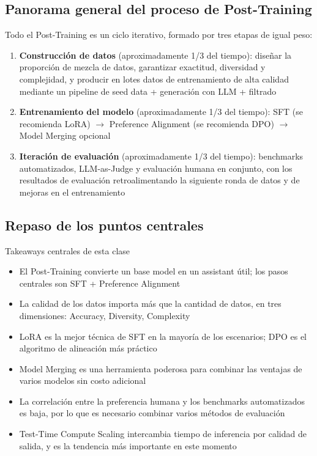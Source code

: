 \documentclass[a4paper]{article}
\begin{document}
\subsection{Panorama general del proceso de Post-Training}

Todo el Post-Training es un ciclo iterativo, formado por tres etapas de igual peso:

\begin{enumerate}
    \item \textbf{Construcción de datos} (aproximadamente 1/3 del tiempo): diseñar la proporción de mezcla de datos, garantizar exactitud, diversidad y complejidad, y producir en lotes datos de entrenamiento de alta calidad mediante un pipeline de seed data + generación con LLM + filtrado
    \item \textbf{Entrenamiento del modelo} (aproximadamente 1/3 del tiempo): SFT (se recomienda LoRA) $\rightarrow$ Preference Alignment (se recomienda DPO) $\rightarrow$ Model Merging opcional
    \item \textbf{Iteración de evaluación} (aproximadamente 1/3 del tiempo): benchmarks automatizados, LLM-as-Judge y evaluación humana en conjunto, con los resultados de evaluación retroalimentando la siguiente ronda de datos y de mejoras en el entrenamiento
\end{enumerate}

\subsection{Repaso de los puntos centrales}

\begin{importantbox}{Takeaways centrales de esta clase}
\begin{itemize}
    \item El Post-Training convierte un base model en un assistant útil; los pasos centrales son SFT + Preference Alignment
    \item La calidad de los datos importa más que la cantidad de datos, en tres dimensiones: Accuracy, Diversity, Complexity
    \item LoRA es la mejor técnica de SFT en la mayoría de los escenarios; DPO es el algoritmo de alineación más práctico
    \item Model Merging es una herramienta poderosa para combinar las ventajas de varios modelos sin costo adicional
    \item La correlación entre la preferencia humana y los benchmarks automatizados es baja, por lo que es necesario combinar varios métodos de evaluación
    \item Test-Time Compute Scaling intercambia tiempo de inferencia por calidad de salida, y es la tendencia más importante en este momento
\end{itemize}
\end{importantbox}
\end{document}
